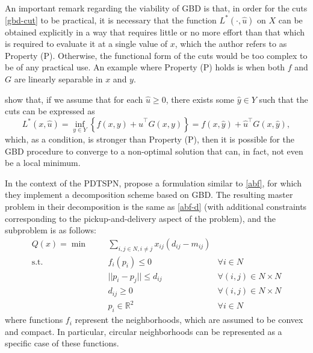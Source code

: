 \documentclass[pdflatex,sn-mathphys-num]{sn-jnl}%
\newcommand*{\transpose}{^{\top}}
\begin{document}
An important remark regarding the viability of GBD is that, in order for the cuts \eqref{gbd-cut} to be practical, it is necessary that the function $L^*(\cdot, \hat{u})$ on $X$ can be obtained explicitly in a way that requires little or no more effort than that which is required to evaluate it at a single value of $x$, which the author refers to as Property (P). Otherwise, the functional form of the cuts would be too complex to be of any practical use. An example where Property (P) holds is when both $f$ and $G$ are linearly separable in $x$ and $y$. 

\citet{bagajewicz} show that, if we assume that for each $\hat{u} \geq 0$, there exists some $\hat{y} \in Y$ such that the cuts can be expressed as
\begin{equation}
    L^*(x,\hat{u}) = \inf_{y\in Y} \left\{f(x,y) + \hat{u}\transpose G(x,y)\right\} = f(x,\hat{y}) + \hat{u}\transpose G(x,\hat{y}),
\end{equation}
which, as a condition, is stronger than Property (P), then it is possible for the GBD procedure to converge to a non-optimal solution that can, in fact, not even be a local minimum.



In the context of the PDTSPN, \citet{walteros} propose a formulation similar to \ref{abf}, for which they implement a decomposition scheme based on GBD. The resulting master problem in their decomposition is the same as \ref{abf-d} (with additional constraints corresponding to the pickup-and-delivery aspect of the problem), and the subproblem is as follows:
\begin{subequations}
\begin{align}
Q(x) = \min &&& \sum_{i,j \in N, i \neq j} x_{ij} (d_{ij} - m_{ij})\\
\text{s.t.} &&& f_i(p_i) \leq 0 &\forall i \in N \label{neigh-constraint-pdtspn}\\
&&& ||p_i - p_j|| \leq d_{ij} &\forall (i,j) \in N \times N \label{dist-constraint-pdtspn}\\
&&& d_{ij}\geq 0 &\forall (i,j) \in N \times N \\
&&& p_i \in \mathbb{R}^2 &\forall i \in N
\end{align}
\end{subequations}
where functions $f_i$ represent the neighborhoods, which are assumed to be convex and compact. In particular, circular neighborhoods can be represented as a specific case of these functions.
\end{document}
